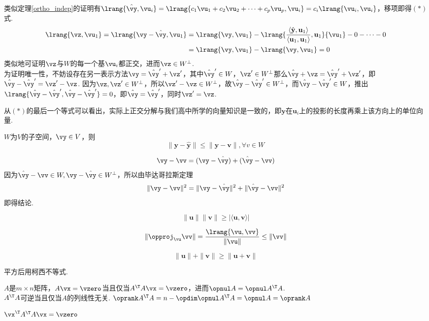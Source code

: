 \begin{analysis}
类似定理\ref{ortho_indep}的证明有$\lrang{\hat{\vy},\vu_i}=\lrang{c_1\vu_1+c_2\vu_2+\cdots+c_p\vu_p,\vu_i}=c_i\lrang{\vu_i,\vu_i}$，移项即得$(*)$式.
\[\begin{aligned}\lrang{\vz,\vu_1}=\lrang{\vy-\hat{\vy},\vu_1}&=\lrang{\vy,\vu_1}-\lrang{\frac{\langle \hat{\mathbf{y}},\mathbf{u}_1\rangle}{\langle\mathbf{u}_1,\mathbf{u}_1\rangle},\mathbf{u}_1}{\vu_1}-0-\cdots-0\\
&=\lrang{\vy,\vu_1}-\lrang{\vy,\vu_1}=0\end{aligned}\]
类似地可证明$\vz$与$W$的每一个基$\vu_i$都正交，进而$\vz\in W^\perp$.\\
为证明唯一性，不妨设存在另一表示方法$\vy=\hat{\vy}'+\vz'$，其中$\hat{\vy}'\in W$，$\vz'\in W^\perp$那么$\hat{\vy}+\vz=\hat{\vy}'+\vz'$，即$\hat{\vy}-\hat{\vy}'=\vz'-\vz$. 因为$\vz,\vz'\in W^\perp$，所以$\vz'-\vz\in W^\perp$，故$\hat{\vy}-\hat{\vy}'\in W^\perp$，而$\hat{\vy}-\hat{\vy}'\in W$，推出$\lrang{\hat{\vy}-\hat{\vy}',\hat{\vy}-\hat{\vy}'}=0$，即$\hat{\vy}=\hat{\vy}'$，同时$\vz'=\vz$.
\end{analysis}
\par 从$(*)$的最后一个等式可以看出，实际上正交分解与我们高中所学的向量知识是一致的，即$\mathbf{y}$在$\mathbf{u}_i$上的投影的长度再乘上该方向上的单位向量.
\begin{theorem}[最佳估计]
$W$为$V$的子空间，$\vy\in V$，则
\[\|\mathbf{y}-\hat{\mathbf{y}}\|\leq\|\mathbf{y}-\mathbf{v}\|,\forall v\in W\]
\end{theorem}
\begin{analysis}
\[\vy-\vv=(\vy-\hat{\vy})+(\hat{\vy}-\vv)\]
因为$\hat{\vy}-\vv\in W,\vy-\hat{\vy}\in W^\perp$，所以由毕达哥拉斯定理
\[\|\vy-\vv\|^2=\|\vy-\hat{\vy}\|^2+\|\hat{\vy}-\vv\|^2\]
即得结论.
\end{analysis}
\begin{theorem}
\[\|\mathbf{u}\|\|\mathbf{v}\|\geq|\langle \mathbf{u},\mathbf{v} \rangle|\]
\end{theorem}
\begin{analysis}
\[\|\opproj_{\vu}\vv\|=\dfrac{\lrang{\vu,\vv}}{\|\vu\|}\leq\|\vv\|\]
\end{analysis}
\begin{theorem}[三角不等式]
\[\|\mathbf{u}\|+\|\mathbf{v}\|\geq\|\mathbf{u}+\mathbf{v}\|\]
\end{theorem}
\begin{analysis}
平方后用柯西不等式.
\end{analysis}
\begin{proposition}%
$A$是$m\times n$矩阵，$A\vx=\vzero$当且仅当$A^\T A\vx=\vzero$，进而$\opnul A=\opnul A^\T A$.\\
$A^\T A$可逆当且仅当$A$的列线性无关. $\oprank A^\T A=n-\opdim\opnul A^\T A=\opnul A=\oprank A$
\end{proposition}
\begin{analysis}
$\vx^\T A^\T A\vx=\vzero$
\end{analysis}

